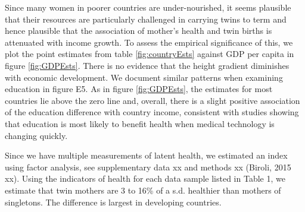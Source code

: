 \documentclass{nature}
\begin{document}
\begin{linenumbers}
Since many women in poorer countries are under-nourished, it seems plausible that their resources are particularly challenged in carrying twins to term and hence plausible that the association of mother's health and twin births is attenuated with income growth. To assess the empirical significance of this, we plot the point estimates from table \ref{fig:countryEsts} against GDP per capita in figure \ref{fig:GDPEsts}. There is no evidence that the height gradient diminishes with economic development. %
We document similar patterns when examining education in figure E5. As in figure \ref{fig:GDPEsts}, the estimates for most countries lie above the zero line and, overall, there is a slight positive association of the education difference with country income, consistent with studies showing that education is most likely to benefit health when medical technology is changing quickly\cite{LlerasMuneyGlied2008}.

Since we have multiple measurements of latent health, we estimated an index using factor analysis, see supplementary data xx and methods xx (Biroli, 2015 xx). Using the indicators of health for each data sample listed in Table 1, we estimate that twin mothers are 3 to 16\% of a s.d. healthier than mothers of singletons. The difference is largest in developing countries.




\end{linenumbers}
\end{document}
